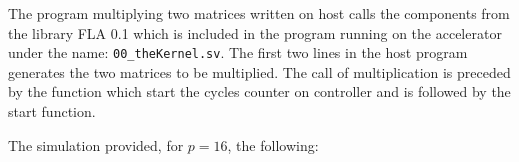 \begin{exemplu}
The program multiplying two matrices written on host calls the components from the library FLA 0.1 which is included in the program running on the accelerator under the name: {\tt 00\_theKernel.sv}. The first two lines in the host program generates the two matrices to be multiplied. The call of multiplication is preceded by the function which start the cycles counter on controller and is followed by the start function. 
{\em 
{}
}

{\em 
{}
}

The simulation provided, for $p=16$, the following:


\end{exemplu}

